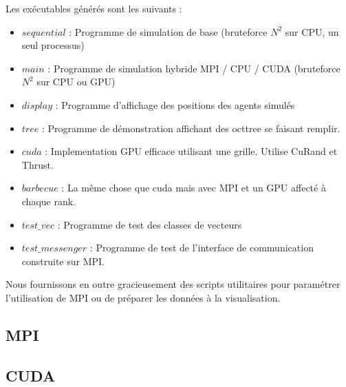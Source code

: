 \documentclass[12pt,a4paper,sans]{article}
\begin{document}
Les exécutables générés sont les suivants :
\begin{itemize}
    \item $sequential$ : Programme de simulation de base (bruteforce $N^2$ sur CPU, un seul processus)
    \item $main$ : Programme de simulation hybride MPI / CPU / CUDA (bruteforce $N^2$ sur CPU ou GPU)
    \item $display$ : Programme d'affichage des positions des agents simulés 
    \item $tree$ : Programme de démonstration affichant des octtree se faisant remplir.
    \item $cuda$ : Implementation GPU efficace utilisant une grille. Utilise CuRand et Thrust.
    \item $barbecue$ : La même chose que cuda mais avec MPI et un GPU affecté à chaque rank.
    \item $test\_vec$ : Programme de test des classes de vecteurs
    \item $test\_messenger$ : Programme de test de l'interface de communication construite sur MPI.
\end{itemize}

Nous fournissons en outre gracieusement des scripts utilitaires pour paramétrer l'utilisation de MPI ou de préparer les données à la visualisation.

\subsection{MPI}

\subsection{CUDA}
\end{document}
